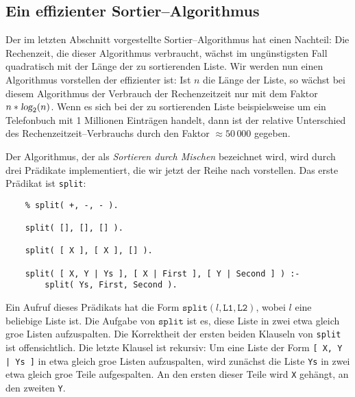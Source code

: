 \subsection{Ein effizienter Sortier--Algorithmus}
Der im letzten Abschnitt vorgestellte Sortier--Algorithmus hat einen Nachteil:  Die Rechenzeit,
die dieser Algorithmus verbraucht, w\"{a}chst im ung\"{u}nstigsten Fall quadratisch mit der L\"{a}nge der zu sortierenden 
Liste.  Wir werden nun einen Algorithmus vorstellen der effizienter ist:  Ist $n$ die L\"{a}nge der Liste, so w\"{a}chst bei diesem Algorithmus
der Verbrauch der 
Rechenzeitzeit nur mit dem Faktor $n * \textsl{log}_2(n)$.
Wenn es sich bei der zu sortierenden Liste beispielsweise um ein Telefonbuch mit 1 Millionen Eintr\"{a}gen handelt,
dann ist der relative Unterschied des Rechenzeitzeit--Verbrauchs durch den Faktor $\approx 50\,000$ gegeben.

Der Algorithmus, der  als \emph{Sortieren durch Mischen} bezeichnet wird,
wird durch drei Pr\"{a}dikate implementiert, die wir jetzt der Reihe nach vorstellen.  Das erste Pr\"{a}dikat ist
\texttt{split}:
\begin{verbatim}
    % split( +, -, - ).

    split( [], [], [] ).

    split( [ X ], [ X ], [] ).

    split( [ X, Y | Ys ], [ X | First ], [ Y | Second ] ) :-
        split( Ys, First, Second ).
\end{verbatim}
Ein Aufruf dieses Pr\"{a}dikats hat die Form $\mathtt{split}(l,\mathtt{L1},\mathtt{L2})$, wobei $l$ eine 
beliebige Liste ist.  Die Aufgabe von $\texttt{split}$ ist es, diese Liste in zwei etwa gleich gro\3e 
Listen aufzuspalten.  Die Korrektheit der ersten beiden Klauseln von \texttt{split} ist offensichtlich.
Die letzte Klausel ist rekursiv: Um eine Liste der Form \texttt{[ X, Y | Ys ]} in etwa gleich gro\3e 
Listen aufzuspalten, wird zun\"{a}chst die Liste \texttt{Ys} in zwei etwa gleich gro\3e Teile aufgespalten.
An den ersten dieser Teile wird \texttt{X} geh\"{a}ngt, an den zweiten \texttt{Y}.

